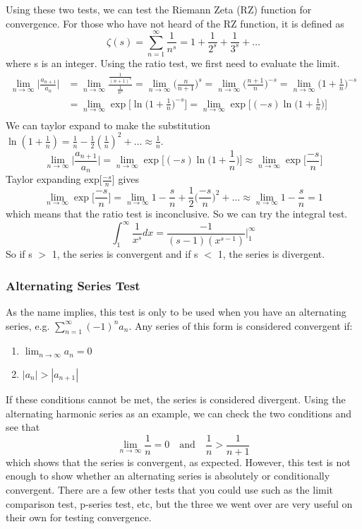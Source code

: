 \documentclass{article}
\newcommand{\be}{\begin{equation}}
\newcommand{\ee}{\end{equation}}
\begin{document}
Using these two tests, we can test the Riemann Zeta (RZ) function for convergence.
For those who have not heard of the RZ function, it is defined as
\be
\zeta(s) = \sum_{n=1}^{\infty} \frac{1}{n^s} = 1 + \frac{1}{2^s} + \frac{1}{3^s}+ \hdots
\ee
where s is an integer.
Using the ratio test, we first need to evaluate the limit.
\begin{align}
\lim_{n \to \infty} \Big| \frac{a_{n+1}}{a_n} \Big| &= \lim_{n \to \infty} \frac{\frac{1}{(n+1)^s}}{\frac{1}{n^s}} = \lim_{n \to \infty} \Big( \frac{n}{n+1} \Big) ^s
= \lim_{n \to \infty} \Big( \frac{n+1}{n} \Big) ^{-s} = \lim_{n \to \infty} \Big( 1 + \frac{1}{n} \Big) ^{-s} \\
&= \lim_{n \to \infty} \exp \Big[ \ln \Big( 1 + \frac{1}{n} \Big) ^{-s} \Big] = \lim_{n \to \infty} \exp \Big[ (-s) \ln \Big( 1 + \frac{1}{n} \Big) \Big] \\
\end{align}
We can taylor expand to make the substitution $\ln(1 + \frac{1}{n}) = \frac{1}{n} - \frac{1}{2}(\frac{1}{n})^2 + \hdots \approx \frac{1}{n}$.
\be
\lim_{n \to \infty} \Big| \frac{a_{n+1}}{a_n} \Big| = \lim_{n \to \infty} \exp \Big[ (-s) \ln \Big( 1 + \frac{1}{n} \Big) \Big] \approx \lim_{n \to \infty} \exp \Big[ \frac{-s}{n} \Big]
\ee
Taylor expanding $\text{exp} \Big[ \frac{-s}{n} \Big]$ gives
\be
\lim_{n \to \infty} \exp \Big[ \frac{-s}{n} \Big] = \lim_{n \to \infty} 1 - \frac{s}{n} + \frac{1}{2} \Big( \frac{-s}{n} \Big)^2 + \hdots \approx \lim_{n \to \infty} 1 - \frac{s}{n} = 1
\ee
which means that the ratio test is inconclusive. So we can try the integral test.
\be
\int_{1}^{\infty} \frac{1}{x^s} dx = \frac{-1}{(s-1)(x^{s-1})} \Big\vert_{1}^{\infty}
\ee
So if s $>$ 1, the series is convergent and if s $<$ 1, the series is divergent.
\subsubsection*{Alternating Series Test}
As the name implies, this test is only to be used when you have an alternating series, e.g. $\sum\limits_{n=1}^{\infty} (-1)^n a_n$.
Any series of this form is considered convergent if:
\begin{enumerate}
  \item $\lim_{n \to \infty} a_n = 0$
  \item $|a_n| > |a_{n+1}|$
\end{enumerate}
If these conditions cannot be met, the series is considered divergent.
Using the alternating harmonic series as an example, we can check the two conditions and see that
\be
\lim_{n \to \infty} \frac{1}{n} = 0 \quad \text{and} \quad \frac{1}{n} > \frac{1}{n+1}
\ee
which shows that the series is convergent, as expected.
However, this test is not enough to show whether an alternating series is absolutely or conditionally convergent.
There are a few other tests that you could use such as the limit comparison test, p-series test, etc, but the three we went over are very useful on their own for testing convergence.
\end{document}
